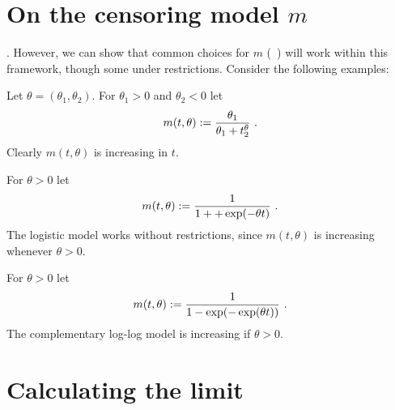 \section{On the censoring model $m$}
. However, we can show that common choices for $m$ (\cf\ ) will work within this framework, though some under restrictions. Consider the following examples:
\begin{example}
	Let $\theta=(\theta_1, \theta_2)$. For $\theta_1>0$ and $\theta_2<0$ let
	$$m(t, \theta) := \frac{\theta_1}{\theta_1 + t^\theta_2}\textrm{ .}$$
	Clearly $m(t,\theta)$ is increasing in $t$. 
\end{example}
%
\begin{example}
	For $\theta>0$ let
	$$m(t, \theta) := \frac{1}{1 + + \exp(-\theta t)}\textrm{ .}$$
	The logistic model works without restrictions, since $m(t,\theta)$ is increasing whenever $\theta>0$.
\end{example}
%
\begin{example}
	For $\theta>0$ let
	$$m(t, \theta) := \frac{1}{1 - \exp(-\exp(\theta t))}\textrm{ .}$$
	The complementary log-log model is increasing if $\theta>0$.
\end{example}

\section{Calculating the limit} \label{sec:model}

